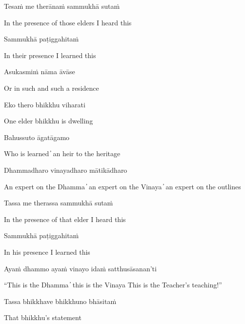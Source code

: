 Tesaṁ me therānaṁ sammukhā sutaṁ

\begin{cprenglish}
In the presence of those elders I heard this
\end{cprenglish}

Sammukhā paṭiggahitaṁ

\begin{cprenglish}
In their presence I learned this
\end{cprenglish}

Asukasmiṁ nāma āvāse

\begin{cprenglish}
Or in such and such a residence
\end{cprenglish}

Eko thero bhikkhu viharati

\begin{cprenglish}
One elder bhikkhu is dwelling
\end{cprenglish}

Bahussuto āgatāgamo

\begin{cprenglish}
Who is learned  ̓  an heir to the heritage
\end{cprenglish}

Dhammadharo vinayadharo mātikādharo

\begin{cprenglish}
An expert on the Dhamma  ̓  an expert on the Vinaya  ̓  an expert on the outlines
\end{cprenglish}

Tassa me therassa sammukhā sutaṁ

\begin{cprenglish}
In the presence of that elder I heard this
\end{cprenglish}

Sammukhā paṭiggahitaṁ

\begin{cprenglish}
In his presence I learned this
\end{cprenglish}

Ayaṁ dhammo ayaṁ vinayo idaṁ satthusāsanan’ti

\begin{cprenglish}
“This is the Dhamma  ̓  this is the Vinaya
This is the Teacher’s teaching!”
\end{cprenglish}

Tassa bhikkhave bhikkhuno bhāsitaṁ

\begin{cprenglish}
That bhikkhu’s statement
\end{cprenglish}


